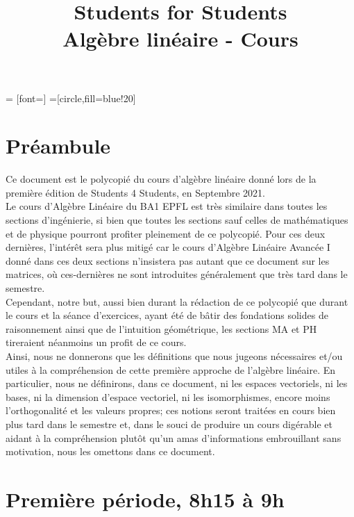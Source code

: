 \documentclass{article}
\title{Students for Students \\Algèbre linéaire - Cours}
\author{}
\date{}
\begin{document}
 = [font=\scriptsize]  
=[circle,fill=blue!20]

\maketitle
\tableofcontents
\newpage
\section*{Préambule}
\noindent Ce document est le polycopié du cours d'algèbre linéaire donné lors de la première édition de Students 4 Students, en Septembre 2021.\\

\noindent Le cours d'Algèbre Linéaire du BA1 EPFL est très similaire dans toutes les sections d'ingénierie, si bien que toutes les sections sauf celles de mathématiques et de physique pourront profiter pleinement de ce polycopié. Pour ces deux dernières, l'intérêt sera plus mitigé car le cours d'Algèbre Linéaire Avancée I donné dans ces deux sections n'insistera pas autant que ce document sur les matrices, où ces-dernières ne sont introduites généralement que très tard dans le semestre. \\

\noindent Cependant, notre but, aussi bien durant la rédaction de ce polycopié que durant le cours et la séance d'exercices, ayant été de bâtir des fondations solides de raisonnement ainsi que de l'intuition géométrique, les sections MA et PH tireraient néanmoins un profit de ce cours. \\

\noindent Ainsi, nous ne donnerons que les définitions que nous jugeons nécessaires et/ou utiles à la compréhension de cette première approche de l'algèbre linéaire. En particulier, nous ne définirons, dans ce document, ni les espaces vectoriels, ni les bases, ni la dimension d'espace vectoriel, ni les isomorphismes, encore moins l'orthogonalité et les valeurs propres; ces notions seront traitées en cours bien plus tard dans le semestre et, dans le souci de produire un cours digérable et aidant à la compréhension plutôt qu'un amas d'informations embrouillant sans motivation, nous les omettons dans ce document. 

\newpage

\section*{Première période, 8h15 à 9h}
\end{document}
